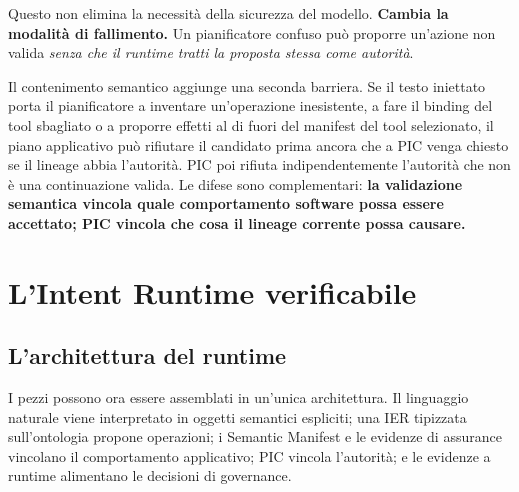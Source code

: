 \documentclass[10pt,oneside,openany]{book}
\begin{document}
Questo non elimina la necessità della sicurezza del modello. \textbf{Cambia la modalità di fallimento.} Un pianificatore confuso può proporre un'azione non valida \emph{senza che il runtime tratti la proposta stessa come autorità}.

Il contenimento semantico aggiunge una seconda barriera. Se il testo iniettato porta il pianificatore a inventare un'operazione inesistente, a fare il binding del tool sbagliato o a proporre effetti al di fuori del manifest del tool selezionato, il piano applicativo può rifiutare il candidato prima ancora che a PIC venga chiesto se il lineage abbia l'autorità. PIC poi rifiuta indipendentemente l'autorità che non è una continuazione valida. Le difese sono complementari: \textbf{la validazione semantica vincola quale comportamento software possa essere accettato; PIC vincola che cosa il lineage corrente possa causare.}

\part{L'Intent Runtime verificabile}

\chapter{L'architettura del runtime}

I pezzi possono ora essere assemblati in un'unica architettura. Il linguaggio naturale viene interpretato in oggetti semantici espliciti; una IER tipizzata sull'ontologia propone operazioni; i Semantic Manifest e le evidenze di assurance vincolano il comportamento applicativo; PIC vincola l'autorità; e le evidenze a runtime alimentano le decisioni di governance.
\end{document}
